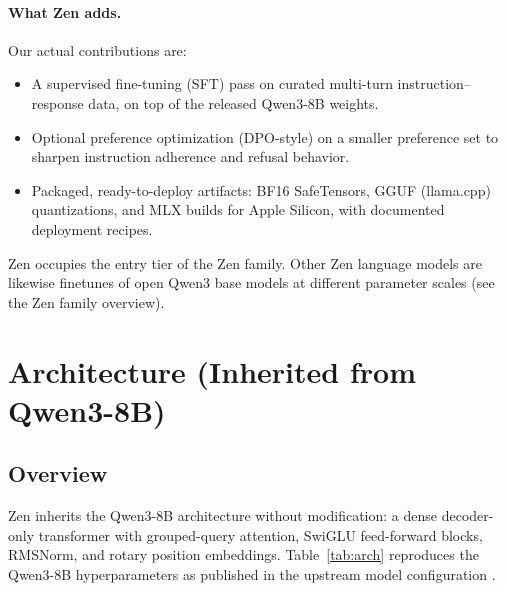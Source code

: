 \documentclass[11pt,a4paper]{article}
\begin{document}
\paragraph{What Zen adds.} Our actual contributions are:

\begin{itemize}
  \item A supervised fine-tuning (SFT) pass on curated multi-turn instruction--response data, on top
        of the released Qwen3-8B weights.
  \item Optional preference optimization (DPO-style) on a smaller preference set to sharpen
        instruction adherence and refusal behavior.
  \item Packaged, ready-to-deploy artifacts: BF16 SafeTensors, GGUF (llama.cpp) quantizations, and
        MLX builds for Apple Silicon, with documented deployment recipes.
\end{itemize}

Zen occupies the entry tier of the Zen family. Other Zen language models are likewise finetunes of
open Qwen3 base models at different parameter scales (see the Zen family overview).

\section{Architecture (Inherited from Qwen3-8B)}

\subsection{Overview}

Zen inherits the Qwen3-8B architecture without modification: a dense decoder-only transformer with
grouped-query attention, SwiGLU feed-forward blocks, RMSNorm, and rotary position embeddings.
Table~\ref{tab:arch} reproduces the Qwen3-8B hyperparameters as published in the upstream model
configuration \cite{qwen3hf}.
\end{document}
